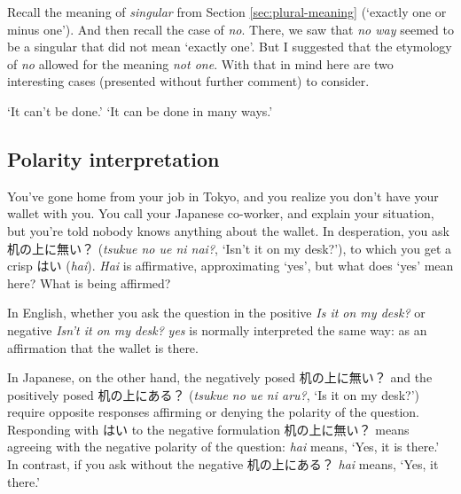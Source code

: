 \begin{tcolorbox}[title=The meaning of \is{no (meaning of)@\textit{no} (meaning of)}\textit{no}, colback=white]
    Recall the meaning of \textit{singular} from Section \ref{sec:plural-meaning} (`exactly one or minus one'). And then recall the case of \textit{no}. There, we saw that \textit{no way} seemed to be a singular that did not mean `exactly one'. But I suggested that the etymology of \textit{no} allowed for the meaning \textit{not one}. With that in mind here are two interesting cases (presented without further comment) to consider.
    
    \ea
        \phantom{[]}`It can't be done.'
        \phantom{[]}`It can be done in many ways.'
        \z
    \z
    \ea
        \z
    \z
\end{tcolorbox}

\subsection{Polarity interpretation}

You've gone home from your job in Tokyo, and you realize you don't have your wallet with you. You call your Japanese co-worker, and explain your situation, but you're told nobody knows anything about the wallet. In desperation, you ask 机の上に無い？ (\textit{tsukue no ue ni nai?}, `Isn't it on my desk?'), to which you get a crisp {はい} (\textit{hai}). \textit{Hai} is affirmative, approximating `yes', but what does `yes' mean here? What is being affirmed?

In English, whether you ask the question in the positive \textit{Is it on my desk?} or negative \textit{Isn't it on my desk?} \textit{yes} is normally interpreted the same way: as an affirmation that the wallet is there. 

In Japanese, on the other hand, the negatively posed 机の上に無い？ and the positively posed 机の上にある？ (\textit{tsukue no ue ni aru?}, `Is it on my desk?') require opposite responses affirming or denying the polarity of the question. Responding with はい to the negative formulation 机の上に無い？ means agreeing with the negative polarity of the question: \textit{hai} means, `Yes, it is  there.' In contrast, if you ask without the negative 机の上にある？ \textit{hai} means, `Yes, it  there.'

